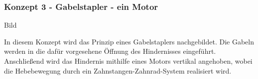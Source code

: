 \documentclass[main.tex]{subfiles} %
\begin{document}
\subsubsection*{Konzept 3 - Gabelstapler - ein Motor}

Bild \newline

In diesem Konzept wird das Prinzip eines Gabelstaplers nachgebildet. Die Gabeln werden in die dafür vorgesehene 
Öffnung des Hindernisses eingeführt. Anschließend wird das Hindernis mithilfe eines Motors vertikal angehoben, 
wobei die Hebebewegung durch ein Zahnstangen-Zahnrad-System realisiert wird.
\end{document}
